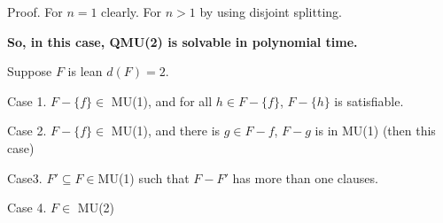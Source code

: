 \documentclass[12pt]{article}
\begin{document}
\begin{CJK*}{GBK}{song}
Proof. For $n=1$ clearly. For $n>1$ by using disjoint splitting. 


{\bf So, in this case, QMU(2) is solvable in polynomial time.}


Suppose $F$ is lean $d(F)=2$. 

Case 1. $F-\{f\}\in$ MU(1), and for all $h\in F-\{f\}$, $F-\{h\}$ is satisfiable.

Case 2. $F-\{f\}\in$ MU(1), and there is $g\in F-f$, $F-g$ is in MU(1) (then this case)

Case3. $F'\subseteq F\in $MU(1) such that $F-F'$ has more than one clauses. 

Case 4. $F\in$ MU(2)


 






\end{CJK*}
\end{document}
